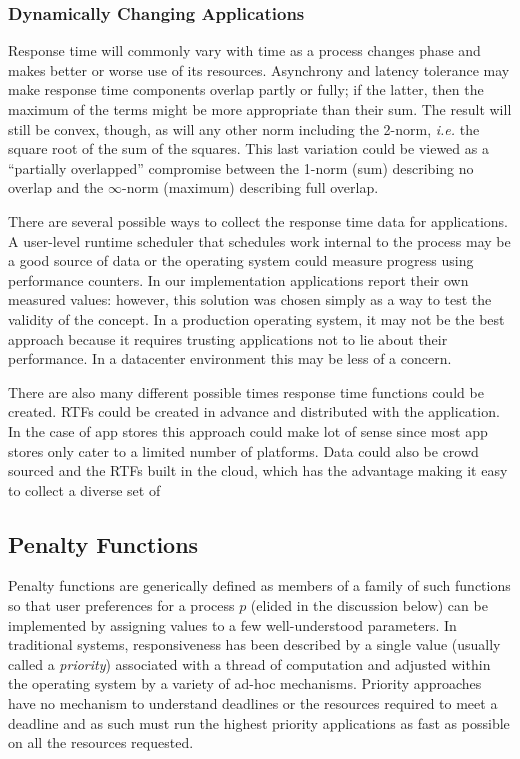 \subsubsection*{Dynamically Changing Applications}
Response time will commonly vary with time as a process changes phase and makes better or worse use of its resources.
Asynchrony and latency tolerance may make response time components overlap partly or fully;
if the latter, then the maximum of the terms might be more appropriate than their sum.
The result will still be convex, though, as will any other norm including the 2-norm,
\emph{i.e.} the square root of the sum of the squares.
This last variation could be viewed as a ``partially overlapped'' compromise between
the 1-norm (sum) describing no overlap and the $\infty$-norm (maximum) describing full overlap.



There are several possible ways to collect the response time data for applications. A user-level runtime scheduler that schedules work internal to the process may be a good source of data or the operating system could measure progress using performance counters.  In our implementation applications report their own measured values: however, this solution was chosen simply as a way to test the validity of the concept.  In a production operating system, it may not be the best approach because it requires trusting applications not to lie about their performance.  In a datacenter environment this may be less of a concern. 

There are also many different possible times response time functions could be created.  RTFs could be created in advance and distributed with the application. In the case of app stores this approach could make lot of sense since most app stores only cater to a limited number of platforms. Data could also be crowd sourced and the RTFs built in the cloud, which has the advantage making it easy to collect a diverse set of 

\subsection*{Penalty Functions}

Penalty functions  are generically defined as members of a family of such functions
so that user preferences for a process $p$ (elided in the discussion below)
can be implemented by assigning values to a few well-understood parameters.
In traditional systems, responsiveness has been described by a single value (usually called a \emph{priority}) associated with a thread of computation and adjusted within the operating system by a variety of ad-hoc mechanisms.   Priority approaches have no mechanism to understand deadlines or the resources required to meet a deadline and as such must run the highest priority applications as fast as possible on all the resources requested. 

